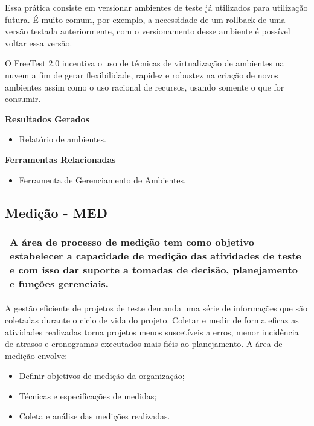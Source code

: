 Essa prática consiste em versionar ambientes de teste já utilizados para utilização futura. É muito comum, por exemplo, a necessidade de um rollback de uma versão testada anteriormente, com o versionamento desse ambiente é possível voltar essa versão.

O FreeTest 2.0 incentiva o uso de técnicas de virtualização de ambientes na nuvem a fim de gerar flexibilidade, rapidez e robustez na criação de novos ambientes assim como o uso racional de recursos, usando somente o que for consumir.

\textbf{Resultados Gerados }
\begin{itemize}
    \item Relatório de ambientes.
\end{itemize}

\textbf{Ferramentas Relacionadas }
\begin{itemize}
    \item Ferramenta de Gerenciamento de Ambientes.
\end{itemize}

\subsection{Medição - MED}
\label{sec:med}

\begin{table}[!ht]
\centering
\begin{tabular}{|p{130mm}|}
\hline
A área de processo de medição tem como objetivo estabelecer a capacidade de medição das atividades de teste e com isso dar suporte a tomadas de decisão, planejamento e funções gerenciais. \\ 
\hline
\end{tabular}
\end{table}

A gestão eficiente de projetos de teste demanda uma série de informações que são coletadas durante o ciclo de vida do projeto. Coletar e medir de forma eficaz as atividades realizadas torna projetos menos suscetíveis a erros, menor incidência de atrasos e cronogramas executados mais fiéis ao planejamento. A área de medição envolve:

\begin{itemize}
    \item Definir objetivos de medição da organização;
    \item Técnicas e especificações de medidas;
    \item Coleta e análise das medições realizadas.
\end{itemize}

